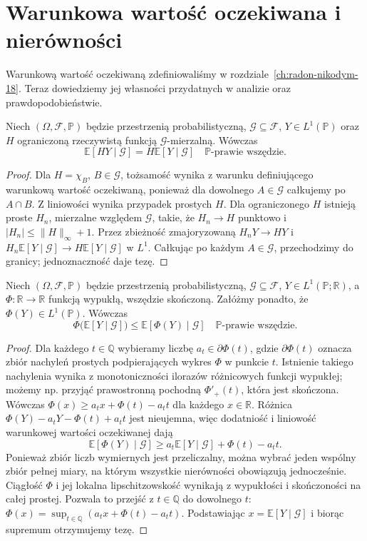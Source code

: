 \section{Warunkowa wartość oczekiwana i nierówności}
Warunkową wartość oczekiwaną zdefiniowaliśmy w
rozdziale~\ref{ch:radon-nikodym-18}. Teraz dowiedziemy
jej własności przydatnych w analizie oraz prawdopodobieństwie.

\begin{lemat}
\label{lem:conditional-pullout-19}
Niech $(\Omega,\mathcal F,\mathbb P)$ będzie przestrzenią
probabilistyczną, $\mathcal G\subseteq\mathcal F$,
$Y\in L^1(\mathbb P)$ oraz $H$ ograniczoną rzeczywistą
funkcją $\mathcal G$-mierzalną. Wówczas
\[
 \mathbb E[HY\mid\mathcal G]
 =H\mathbb E[Y\mid\mathcal G]
 \quad\mathbb P\text{-prawie wszędzie}.
\]
\end{lemat}
\begin{proof}
Dla $H=\chi_B$, $B\in\mathcal G$, tożsamość wynika
z warunku definiującego warunkową wartość oczekiwaną,
ponieważ dla dowolnego $A\in\mathcal G$ całkujemy po
$A\cap B$. Z liniowości wynika przypadek prostych $H$.
Dla ograniczonego $H$ istnieją proste $H_n$, mierzalne
względem $\mathcal G$, takie, że $H_n\to H$ punktowo
i $|H_n|\le\|H\|_\infty+1$. Przez zbieżność zmajoryzowaną
$H_nY\to HY$ i $H_n\mathbb E[Y\mid\mathcal G]
\to H\mathbb E[Y\mid\mathcal G]$ w $L^1$.
Całkując po każdym $A\in\mathcal G$, przechodzimy
do granicy; jednoznaczność daje tezę.
\end{proof}

\begin{twierdzenie}
\label{thm:conditional-jensen-19}
Niech $(\Omega,\mathcal F,\mathbb P)$ będzie przestrzenią
probabilistyczną, $\mathcal G\subseteq\mathcal F$,
$Y\in L^1(\mathbb P;\mathbb R)$, a
$\Phi:\mathbb R\to\mathbb R$ funkcją wypukłą, wszędzie
skończoną. Załóżmy ponadto, że $\Phi(Y)\in L^1(\mathbb P)$.
Wówczas
\[
 \Phi\bigl(\mathbb E[Y\mid\mathcal G]\bigr)
 \le\mathbb E[\Phi(Y)\mid\mathcal G]
 \quad\mathbb P\text{-prawie wszędzie}.
\]
\end{twierdzenie}
\begin{proof}
Dla każdego $t\in\mathbb Q$ wybieramy liczbę
$a_t\in\partial\Phi(t)$, gdzie
$\partial\Phi(t)$ oznacza zbiór nachyleń prostych
podpierających wykres $\Phi$ w punkcie $t$.
Istnienie takiego nachylenia wynika z monotoniczności
ilorazów różnicowych funkcji wypukłej; możemy np. przyjąć
prawostronną pochodną $\Phi'_+(t)$, która jest skończona.
Wówczas
$\Phi(x)\ge a_tx+\Phi(t)-a_tt$ dla każdego $x\in\mathbb R$.
Różnica
$\Phi(Y)-a_tY-\Phi(t)+a_tt$ jest nieujemna,
więc dodatniość i liniowość warunkowej wartości oczekiwanej
dają
\[
\mathbb E[\Phi(Y)\mid\mathcal G]
\ge a_t\mathbb E[Y\mid\mathcal G]+\Phi(t)-a_tt.
\]
Ponieważ zbiór liczb wymiernych jest przeliczalny,
można wybrać jeden wspólny zbiór pełnej miary, na którym
wszystkie nierówności obowiązują jednocześnie.
Ciągłość $\Phi$ i jej lokalna lipschitzowskość
wynikają z wypukłości i skończoności na całej prostej.
Pozwala to przejść z $t\in\mathbb Q$ do dowolnego $t$:
$\Phi(x)=\sup_{t\in\mathbb Q}
(a_tx+\Phi(t)-a_tt)$.
Podstawiając $x=\mathbb E[Y\mid\mathcal G]$
i biorąc supremum otrzymujemy tezę.
\end{proof}

